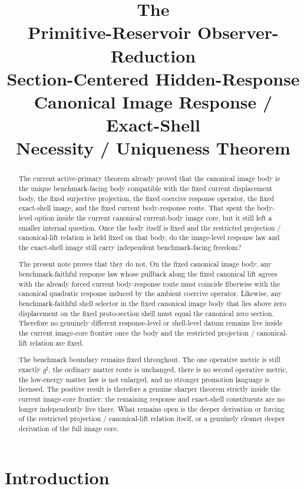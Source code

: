 \documentclass[11pt]{article}
\title{\textbf{The \TheoryName{}}\\[0.4em]
\large Primitive-Reservoir Observer-Reduction\\
\large Section-Centered Hidden-Response\\
\large Canonical Image Response / Exact-Shell\\
\large Necessity / Uniqueness Theorem}
\author{}
\date{}
\newcommand{\CompletedMetric}{g^{\sharp}}
\begin{document}
\maketitle

\begin{abstract}
The current active-primary theorem already proved that the canonical image body is the unique benchmark-facing body compatible with the fixed current displacement body, the fixed surjective projection, the fixed coercive response operator, the fixed exact-shell image, and the fixed current body-response route. That spent the body-level option inside the current canonical current-body image core, but it still left a smaller internal question. Once the body itself is fixed and the restricted projection / canonical-lift relation is held fixed on that body, do the image-level response law and the exact-shell image still carry independent benchmark-facing freedom?

The present note proves that they do not. On the fixed canonical image body, any benchmark-faithful response law whose pullback along the fixed canonical lift agrees with the already forced current body-response route must coincide fiberwise with the canonical quadratic response induced by the ambient coercive operator. Likewise, any benchmark-faithful shell selector in the fixed canonical image body that lies above zero displacement on the fixed proto-section shell must equal the canonical zero section. Therefore no genuinely different response-level or shell-level datum remains live inside the current image-core frontier once the body and the restricted projection / canonical-lift relation are fixed.

The benchmark boundary remains fixed throughout. The one operative metric is still exactly \(\CompletedMetric\), the ordinary matter route is unchanged, there is no second operative metric, the low-energy matter law is not enlarged, and no stronger promotion language is licensed. The positive result is therefore a genuine sharper theorem strictly inside the current image-core frontier: the remaining response and exact-shell constituents are no longer independently live there. What remains open is the deeper derivation or forcing of the restricted projection / canonical-lift relation itself, or a genuinely cleaner deeper derivation of the full image core.
\end{abstract}

\section{Introduction}
\end{document}
